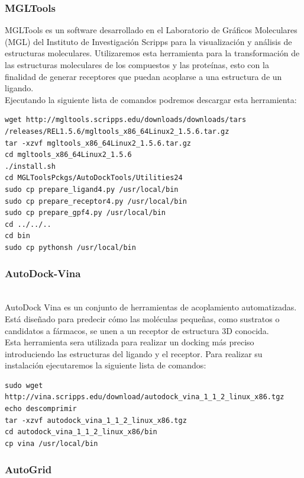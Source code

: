 {\subsubsection{MGLTools}

\noindent MGLTools es un software desarrollado en el Laboratorio de Gráficos Moleculares (MGL) del Instituto de Investigación Scripps para la visualización y análisis de estructuras moleculares.
Utilizaremos esta herramienta para la transformación de las estructuras moleculares de los compuestos y las proteínas, esto  con la finalidad de generar receptores que puedan acoplarse a una estructura de un ligando.\\

\noindent Ejecutando la siguiente lista de comandos podremos descargar esta herramienta:
\begin{lstlisting}
wget http://mgltools.scripps.edu/downloads/downloads/tars
/releases/REL1.5.6/mgltools_x86_64Linux2_1.5.6.tar.gz
tar -xzvf mgltools_x86_64Linux2_1.5.6.tar.gz
cd mgltools_x86_64Linux2_1.5.6
./install.sh
cd MGLToolsPckgs/AutoDockTools/Utilities24
sudo cp prepare_ligand4.py /usr/local/bin
sudo cp prepare_receptor4.py /usr/local/bin
sudo cp prepare_gpf4.py /usr/local/bin
cd ../../..
cd bin
sudo cp pythonsh /usr/local/bin
\end{lstlisting}


\subsubsection{AutoDock-Vina}\\

\noindent AutoDock Vina es un conjunto de herramientas de acoplamiento automatizadas. Está diseñado para predecir cómo las moléculas pequeñas, como sustratos o candidatos a fármacos, se unen a un receptor de estructura 3D conocida.\\

\noindent Esta herramienta sera utilizada para realizar un docking más preciso introduciendo las estructuras del ligando y el receptor.
Para realizar su instalación ejecutaremos la siguiente lista de comandos:
\begin{lstlisting}
sudo wget http://vina.scripps.edu/download/autodock_vina_1_1_2_linux_x86.tgz
echo descomprimir
tar -xzvf autodock_vina_1_1_2_linux_x86.tgz
cd autodock_vina_1_1_2_linux_x86/bin
cp vina /usr/local/bin
\end{lstlisting}

\subsubsection{AutoGrid}\\

}

